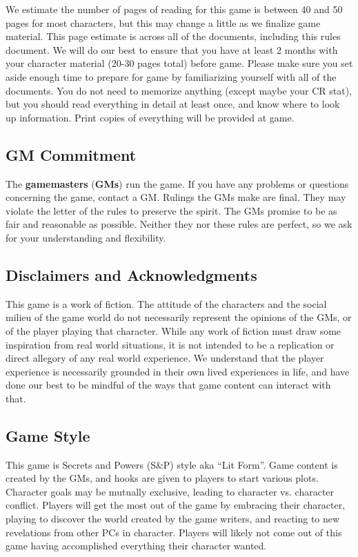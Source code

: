 \documentclass[sheet]{GL2020}
\begin{document}
We estimate the number of pages of reading for this game is between 40 and 50 pages for most characters, but this may change a little as we finalize game material. This page estimate is across all of the documents, including this rules document. We will do our best to ensure that you have at least 2 months with your character material (20-30 pages total) before game. Please make sure you set aside enough time to prepare for game by familiarizing yourself with all of the documents. You do not need to memorize anything (except maybe your CR stat), but you should read everything in detail at least once, and know where to look up information. Print copies of everything will be provided at game.

\subsection{GM Commitment}
The \textbf{gamemasters} (\textbf{GMs}) run the game. If you have any problems or questions concerning the game, contact a GM. Rulings the GMs make are final.  They may violate the letter of the rules to preserve the spirit.  The GMs promise to be as fair and reasonable as possible. Neither they nor these rules are perfect, so we ask for your understanding and flexibility.

\subsection{Disclaimers and Acknowledgments}
This game is a work of fiction. The attitude of the characters and the social milieu of the game world do not necessarily represent the opinions of the GMs, or of the player playing that character. While any work of fiction must draw some inspiration from real world situations, it is not intended to be a replication or direct allegory of any real world experience. We understand that the player experience is necessarily grounded in their own lived experiences in life, and have done our best to be mindful of the ways that game content can interact with that. 

\subsection{Game Style}
This game is Secrets and Powers (S\&P) style aka ``Lit Form''. Game content is created by the GMs, and hooks are given to players to start various plots. Character goals may be mutually exclusive, leading to character vs. character conflict. Players will get the most out of the game by embracing their character, playing to discover the world created by the game writers, and reacting to new revelations from other PCs in character. Players will likely not come out of this game having accomplished everything their character wanted.
\end{document}
